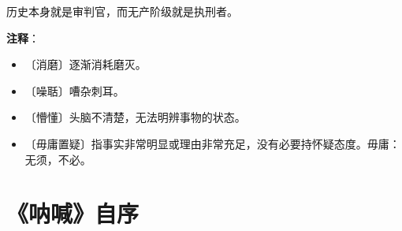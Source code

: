 \documentclass[12pt,UTF-8,openany]{ctexbook}
\begin{document}
\begin{large}
    历史本身就是审判官，而无产阶级就是执刑者。
    
\end{large}


\newpage

\textbf{注释}：

\vspace{-1em}

\begin{itemize}
    \setlength\itemsep{-0.2em}
    \item 〔消磨〕逐渐消耗磨灭。
    \item 〔噪聒〕嘈杂刺耳。
    \item 〔懵懂〕头脑不清楚，无法明辨事物的状态。
    \item 〔毋庸置疑〕指事实非常明显或理由非常充足，没有必要持怀疑态度。毋庸：无须，不必。
\end{itemize}

\chapter{《呐喊》自序}
\end{document}
